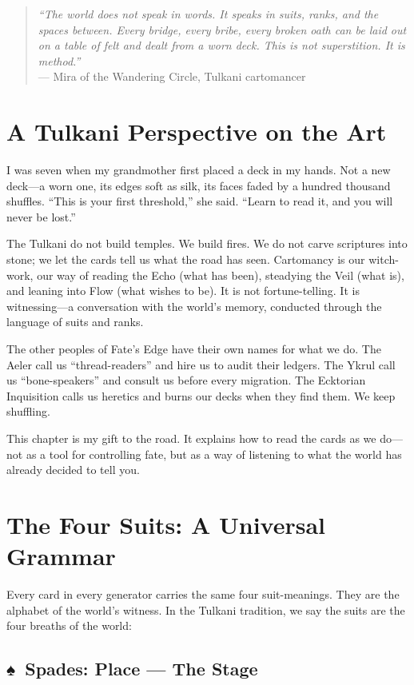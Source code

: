 \documentclass[12pt,oneside]{book}
\renewcommand{\spadesuit}{♠}
\begin{document}
\begin{quote}
\textit{``The world does not speak in words. It speaks in suits, ranks, and the spaces between. Every bridge, every bribe, every broken oath can be laid out on a table of felt and dealt from a worn deck. This is not superstition. It is method.''}\\
\hfill --- Mira of the Wandering Circle, Tulkani cartomancer
\end{quote}

\section*{A Tulkani Perspective on the Art}

I was seven when my grandmother first placed a deck in my hands. Not a new deck---a worn one, its edges soft as silk, its faces faded by a hundred thousand shuffles. ``This is your first threshold,'' she said. ``Learn to read it, and you will never be lost.''

The Tulkani do not build temples. We build fires. We do not carve scriptures into stone; we let the cards tell us what the road has seen. Cartomancy is our witch-work, our way of reading the Echo (what has been), steadying the Veil (what is), and leaning into Flow (what wishes to be). It is not fortune-telling. It is witnessing---a conversation with the world's memory, conducted through the language of suits and ranks.

The other peoples of Fate's Edge have their own names for what we do. The Aeler call us ``thread-readers'' and hire us to audit their ledgers. The Ykrul call us ``bone-speakers'' and consult us before every migration. The Ecktorian Inquisition calls us heretics and burns our decks when they find them. We keep shuffling.

This chapter is my gift to the road. It explains how to read the cards as we do---not as a tool for controlling fate, but as a way of listening to what the world has already decided to tell you.

\section*{The Four Suits: A Universal Grammar}

Every card in every generator carries the same four suit-meanings. They are the alphabet of the world's witness. In the Tulkani tradition, we say the suits are the four breaths of the world:

\subsection*{\spadesuit\ Spades: Place --- The Stage}
\end{document}
